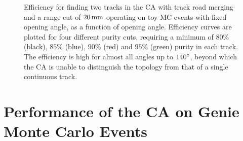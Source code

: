 \begin{figure}
\centering
{}
\caption[Efficiency for finding 2 tracks for CA with merging and range cut operating on toy MC events]{\label{fig:ca_toy_rcut_twotrack_efficiency}Efficiency for finding two tracks in the \ac{CA} with track road merging and a range cut of $20\,\mathrm{mm}$ operating on toy MC events with fixed opening angle, as a function of opening angle. Efficiency curves are plotted for four different purity cuts, requiring a minimum of $80\%$ (black), $85\%$ (blue), $90\%$ (red) and $95\%$ (green) purity in each track. The efficiency is high for almost all angles up to $140^\circ$, beyond which the \ac{CA} is unable to distinguish the topology from that of a single continuous track.}
\end{figure}


\section{Performance of the \acl{CA} on Genie Monte Carlo Events}
